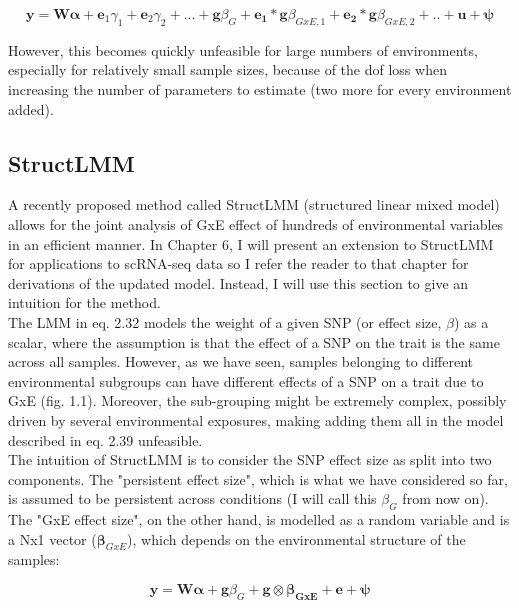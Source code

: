 \begin{equation}\label{eq22:Interaction_test_FE_LMM}
 \mathbf{y} =  \mathbf{W}\boldsymbol{\alpha} + \mathbf{e}_1\gamma_1 + \mathbf{e}_2\gamma_2 + ...  + \mathbf{g}\beta_G + \mathbf{e_1}*\mathbf{g}\beta_{GxE,1}+ \mathbf{e_2}*\mathbf{g}\beta_{GxE,2} + .. + \mathbf{u} + \boldsymbol{\psi} 
\end{equation}

However, this becomes quickly unfeasible for large numbers of environments, especially for relatively small sample sizes, because of the dof loss when increasing the number of parameters to estimate (two more for every environment added).


\subsection{StructLMM}

A recently proposed method called StructLMM (structured linear mixed model) allows for the joint analysis of GxE effect of hundreds of environmental variables \cite{moore2019linear} in an efficient manner.
In Chapter 6, I will present an extension to StructLMM for applications to scRNA-seq data so I refer the reader to that chapter for derivations of the updated model.
Instead, I will use this section to give an intuition for the method.\\

The LMM in eq. 2.32 models the weight of a given SNP (or effect size, $\beta$) as a scalar, where the assumption is that the effect of a SNP on the trait is the same across all samples.
However, as we have seen, samples belonging to different environmental subgroups can have different effects of a SNP on a trait due to GxE (fig. 1.1).
Moreover, the sub-grouping might be extremely complex, possibly driven by several environmental exposures, making adding them all in the model described in eq. 2.39 unfeasible.\\

The intuition of StructLMM is to consider the SNP effect size as split into two components.
The "persistent effect size", which is what we have considered so far, is assumed to be persistent across conditions (I will call this $\beta_G$ from now on). 
The "GxE effect size", on the other hand, is modelled as a random variable and is a Nx1 vector ($\boldsymbol{\beta}_{GxE}$), which depends on the environmental structure of the samples:

\begin{equation}\label{eq23:StructLMM-int}
 \mathbf{y} =  \mathbf{W}\boldsymbol{\alpha} + \mathbf{g}\beta_G + \mathbf{g} \otimes \boldsymbol{\beta_{GxE}} + \mathbf{e} + \boldsymbol{\psi} 
\end{equation}

